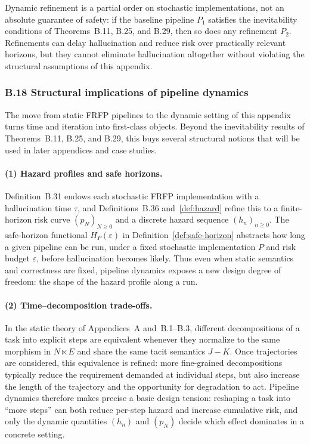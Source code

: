 \begin{remark}[Limitations]
Dynamic refinement is a partial order on stochastic implementations, not an absolute
guarantee of safety: if the baseline pipeline $P_1$ satisfies the inevitability conditions
of Theorems~B.11, B.25, and B.29, then so does any refinement $P_2$. Refinements can
delay hallucination and reduce risk over practically relevant horizons, but they cannot
eliminate hallucination altogether without violating the structural assumptions of this
appendix.
\end{remark}

\subsubsection*{B.18 Structural implications of pipeline dynamics}

The move from static FRFP pipelines to the dynamic setting of this appendix
turns time and iteration into first-class objects. Beyond the inevitability
results of Theorems~B.11, B.25, and B.29, this buys several structural
notions that will be used in later appendices and case studies.

\paragraph{(1) Hazard profiles and safe horizons.}
Definition~B.31 endows each stochastic FRFP implementation with a
hallucination time $\tau$, and Definitions~B.36 and~\ref{def:hazard} refine
this to a finite-horizon risk curve $(p_N)_{N \ge 0}$ and a discrete hazard
sequence $(h_n)_{n \ge 0}$. The safe-horizon functional
$H_P(\varepsilon)$ in Definition~\ref{def:safe-horizon} abstracts how long a
given pipeline can be run, under a fixed stochastic implementation $P$ and
risk budget $\varepsilon$, before hallucination becomes likely. Thus even
when static semantics and correctness are fixed, pipeline dynamics exposes a
new design degree of freedom: the shape of the hazard profile along a run.

\paragraph{(2) Time--decomposition trade-offs.}
In the static theory of Appendices~A and~B.1--B.3, different decompositions
of a task into explicit steps are equivalent whenever they normalize to the
same morphism in $N \ltimes E$ and share the same tacit semantics $J{-}K$.
Once trajectories are considered, this equivalence is refined: more
fine-grained decompositions typically reduce the requirement demanded at
individual steps, but also increase the length of the trajectory and the
opportunity for degradation to act. Pipeline dynamics therefore makes precise
a basic design tension: reshaping a task into ``more steps'' can both reduce
per-step hazard and increase cumulative risk, and only the dynamic
quantities $(h_n)$ and $(p_N)$ decide which effect dominates in a concrete
setting.

